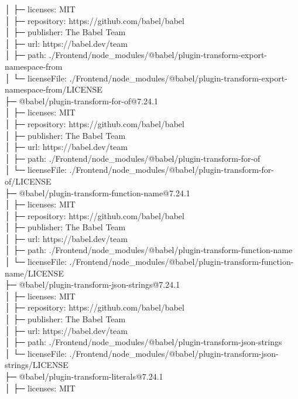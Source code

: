 │  ├─ licenses: MIT\\
│  ├─ repository: https://github.com/babel/babel\\
│  ├─ publisher: The Babel Team\\
│  ├─ url: https://babel.dev/team\\
│  ├─ path: ./Frontend/node\_modules/@babel/plugin-transform-export-namespace-from\\
│  └─ licenseFile: ./Frontend/node\_modules/@babel/plugin-transform-export-namespace-from/LICENSE\\
├─ @babel/plugin-transform-for-of@7.24.1\\
│  ├─ licenses: MIT\\
│  ├─ repository: https://github.com/babel/babel\\
│  ├─ publisher: The Babel Team\\
│  ├─ url: https://babel.dev/team\\
│  ├─ path: ./Frontend/node\_modules/@babel/plugin-transform-for-of\\
│  └─ licenseFile: ./Frontend/node\_modules/@babel/plugin-transform-for-of/LICENSE\\
├─ @babel/plugin-transform-function-name@7.24.1\\
│  ├─ licenses: MIT\\
│  ├─ repository: https://github.com/babel/babel\\
│  ├─ publisher: The Babel Team\\
│  ├─ url: https://babel.dev/team\\
│  ├─ path: ./Frontend/node\_modules/@babel/plugin-transform-function-name\\
│  └─ licenseFile: ./Frontend/node\_modules/@babel/plugin-transform-function-name/LICENSE\\
├─ @babel/plugin-transform-json-strings@7.24.1\\
│  ├─ licenses: MIT\\
│  ├─ repository: https://github.com/babel/babel\\
│  ├─ publisher: The Babel Team\\
│  ├─ url: https://babel.dev/team\\
│  ├─ path: ./Frontend/node\_modules/@babel/plugin-transform-json-strings\\
│  └─ licenseFile: ./Frontend/node\_modules/@babel/plugin-transform-json-strings/LICENSE\\
├─ @babel/plugin-transform-literals@7.24.1\\
│  ├─ licenses: MIT\\
